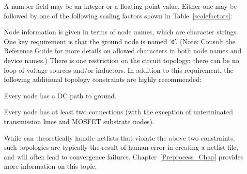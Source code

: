 A number field may be an integer or a floating-point value.  Either one may be
followed by one of the following  scaling
factors shown in Table~\ref{scalefactors}:

\begin{table}[H]
  \caption{Scaling factors.}\label{scalefactors}
\end{table}

Node information is given in terms of   node names, which are character strings.  One key
requirement is that the  ground node is named `\texttt{0}'.
(Note: Consult the \Xyce{} Reference Guide\ReferenceGuide{} for more details on 
allowed characters in both node names and device names.)
There is one restriction on the  
circuit topology: there can be no loop of voltage sources and/or inductors.
In addition to this requirement, the following additional topology 
constraints are highly recommended:
\begin{XyceItemize}
\item Every node has a DC path to ground.
\item Every node has at least two connections (with the exception of
  unterminated transmission lines and MOSFET substrate nodes).
\end{XyceItemize}
While \Xyce{} can theoretically handle netlists that violate the above two 
constraints, such topologies are typically the result of human error in 
creating a netlist file, and will often lead to convergence failures.  Chapter~\ref{Preprocess_Chap} provides more information on this topic.


